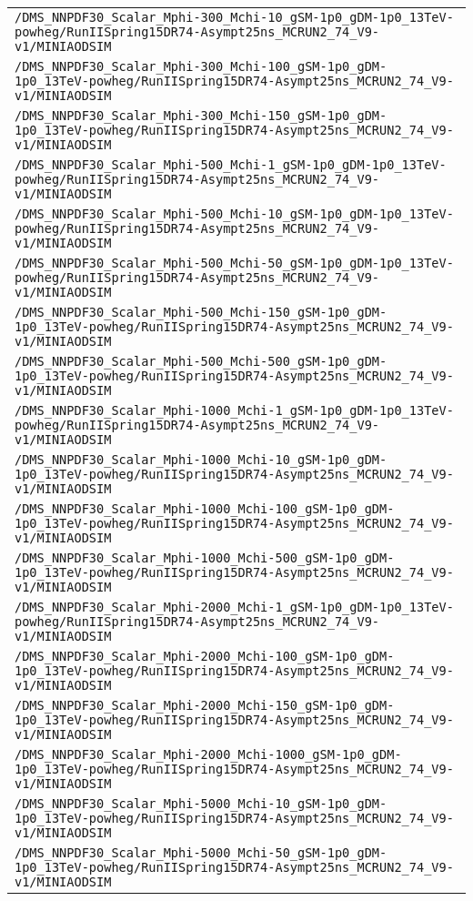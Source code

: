 \begin{center}
\begin{tabular}{l}
\verb!/DMS_NNPDF30_Scalar_Mphi-300_Mchi-10_gSM-1p0_gDM-1p0_13TeV-powheg/RunIISpring15DR74-Asympt25ns_MCRUN2_74_V9-v1/MINIAODSIM! \tabularnewline
\verb!/DMS_NNPDF30_Scalar_Mphi-300_Mchi-100_gSM-1p0_gDM-1p0_13TeV-powheg/RunIISpring15DR74-Asympt25ns_MCRUN2_74_V9-v1/MINIAODSIM! \tabularnewline
\verb!/DMS_NNPDF30_Scalar_Mphi-300_Mchi-150_gSM-1p0_gDM-1p0_13TeV-powheg/RunIISpring15DR74-Asympt25ns_MCRUN2_74_V9-v1/MINIAODSIM! \tabularnewline
\verb!/DMS_NNPDF30_Scalar_Mphi-500_Mchi-1_gSM-1p0_gDM-1p0_13TeV-powheg/RunIISpring15DR74-Asympt25ns_MCRUN2_74_V9-v1/MINIAODSIM! \tabularnewline
\verb!/DMS_NNPDF30_Scalar_Mphi-500_Mchi-10_gSM-1p0_gDM-1p0_13TeV-powheg/RunIISpring15DR74-Asympt25ns_MCRUN2_74_V9-v1/MINIAODSIM! \tabularnewline
\verb!/DMS_NNPDF30_Scalar_Mphi-500_Mchi-50_gSM-1p0_gDM-1p0_13TeV-powheg/RunIISpring15DR74-Asympt25ns_MCRUN2_74_V9-v1/MINIAODSIM! \tabularnewline
\verb!/DMS_NNPDF30_Scalar_Mphi-500_Mchi-150_gSM-1p0_gDM-1p0_13TeV-powheg/RunIISpring15DR74-Asympt25ns_MCRUN2_74_V9-v1/MINIAODSIM! \tabularnewline
\verb!/DMS_NNPDF30_Scalar_Mphi-500_Mchi-500_gSM-1p0_gDM-1p0_13TeV-powheg/RunIISpring15DR74-Asympt25ns_MCRUN2_74_V9-v1/MINIAODSIM! \tabularnewline
\verb!/DMS_NNPDF30_Scalar_Mphi-1000_Mchi-1_gSM-1p0_gDM-1p0_13TeV-powheg/RunIISpring15DR74-Asympt25ns_MCRUN2_74_V9-v1/MINIAODSIM! \tabularnewline
\verb!/DMS_NNPDF30_Scalar_Mphi-1000_Mchi-10_gSM-1p0_gDM-1p0_13TeV-powheg/RunIISpring15DR74-Asympt25ns_MCRUN2_74_V9-v1/MINIAODSIM! \tabularnewline
\verb!/DMS_NNPDF30_Scalar_Mphi-1000_Mchi-100_gSM-1p0_gDM-1p0_13TeV-powheg/RunIISpring15DR74-Asympt25ns_MCRUN2_74_V9-v1/MINIAODSIM! \tabularnewline
\verb!/DMS_NNPDF30_Scalar_Mphi-1000_Mchi-500_gSM-1p0_gDM-1p0_13TeV-powheg/RunIISpring15DR74-Asympt25ns_MCRUN2_74_V9-v1/MINIAODSIM! \tabularnewline
\verb!/DMS_NNPDF30_Scalar_Mphi-2000_Mchi-1_gSM-1p0_gDM-1p0_13TeV-powheg/RunIISpring15DR74-Asympt25ns_MCRUN2_74_V9-v1/MINIAODSIM! \tabularnewline
\verb!/DMS_NNPDF30_Scalar_Mphi-2000_Mchi-100_gSM-1p0_gDM-1p0_13TeV-powheg/RunIISpring15DR74-Asympt25ns_MCRUN2_74_V9-v1/MINIAODSIM! \tabularnewline
\verb!/DMS_NNPDF30_Scalar_Mphi-2000_Mchi-150_gSM-1p0_gDM-1p0_13TeV-powheg/RunIISpring15DR74-Asympt25ns_MCRUN2_74_V9-v1/MINIAODSIM! \tabularnewline
\verb!/DMS_NNPDF30_Scalar_Mphi-2000_Mchi-1000_gSM-1p0_gDM-1p0_13TeV-powheg/RunIISpring15DR74-Asympt25ns_MCRUN2_74_V9-v1/MINIAODSIM! \tabularnewline
\verb!/DMS_NNPDF30_Scalar_Mphi-5000_Mchi-10_gSM-1p0_gDM-1p0_13TeV-powheg/RunIISpring15DR74-Asympt25ns_MCRUN2_74_V9-v1/MINIAODSIM! \tabularnewline
\verb!/DMS_NNPDF30_Scalar_Mphi-5000_Mchi-50_gSM-1p0_gDM-1p0_13TeV-powheg/RunIISpring15DR74-Asympt25ns_MCRUN2_74_V9-v1/MINIAODSIM! \tabularnewline

\end{tabular}
\end{center}
